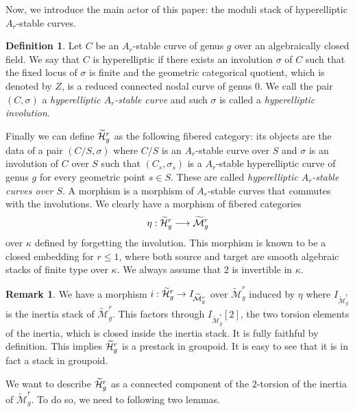 \documentclass{alggeom}
\numberwithin{equation}{section}
\numberwithin{subsection}{section}
\theoremstyle{definition}
\newtheorem{definition}[theorem]{Definition}
\newtheorem{remark}[theorem]{Remark}
\theoremstyle{remark}
\newcommand\arr{\ifinner\to\else\longrightarrow\fi}
\newcommand\larr{\longrightarrow}
\newcommand{\Mtilde}{\widetilde{\mathcal M}}
\newcommand{\Htilde}{\widetilde{\cH}}
\begin{document}
Now, we introduce the main actor of this paper: the moduli stack of hyperelliptic $A_r$-stable curves. 

\begin{definition}
	Let $C$ be an $A_r$-stable curve of genus $g$ over an algebraically closed field. We say that $C$ is hyperelliptic if there exists an involution $\sigma$ of $C$ such that the fixed locus of $\sigma$ is finite and the geometric categorical quotient, which is denoted by $Z$, is a reduced connected nodal curve of genus $0$. We  call the pair $(C,\sigma)$ a \emph{hyperelliptic $A_r$-stable curve} and such $\sigma$  is called a \emph{hyperelliptic involution}.
\end{definition}

Finally we can define $\Htilde_g^r$ as the following fibered category: its objects are the data of a pair $(C/S,\sigma)$ where $C/S$ is an $A_r$-stable curve over $S$ and $\sigma$ is an involution of $C$ over $S$ such that $(C_s,\sigma_s)$ is a $A_r$-stable hyperelliptic curve of genus $g$ for every geometric point $s \in S$. These are called \emph{hyperelliptic $A_r$-stable curves over $S$}. A morphism is a morphism of $A_r$-stable curves that commutes with the involutions. We clearly have a morphism of fibered categories 
$$\eta:\Htilde_g^r  \larr \Mtilde_g^r$$
 over $\kappa$ defined by forgetting the involution. This morphism is known to be a closed embedding for $r\leq 1$, where both source and target are smooth algebraic stacks of finite type over $\kappa$. We always assume that $2$ is invertible in $\kappa$.
 \begin{remark}
 	 We have a morphism $i:\Htilde_g^r \arr \mathit{I}_{\Mtilde_g^r}$ over $\Mtilde_g^r$ induced by $\eta$ where $\mathit{I}_{\Mtilde_g^r}$ is the inertia stack of $\Mtilde_g^r$. This factors through $\mathit{I}_{\Mtilde_g^r}[2]$, the two torsion elements of the inertia, which is closed inside the inertia stack. It is fully faithful by definition. This implies $\Htilde_g^r$ is a prestack in groupoid. It is easy to see that it is in fact a stack in groupoid.
 \end{remark}

We want to describe $\Htilde_g^r$ as a connected component of the $2$-torsion of the inertia of $\Mtilde_g^r$. To do so, we need to following two lemmas.  
\end{document}
